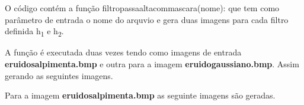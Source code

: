 \documentclass[10pt,a4paper]{article}
\begin{document}
\begin{flushleft}
O código contém a função {\ttfamily filtro\textunderscore passa\textunderscore alta\textunderscore com\textunderscore mascara(nome):} que tem como parâmetro de entrada o nome do arquvio e gera duas imagens para cada filtro definida h\textsubscript{1} e h\textsubscript{2}.
\end{flushleft}

\begin{flushleft}
A função é executada duas vezes tendo como imagens de entrada  \textbf{e\textunderscore ruido\textunderscore salpimenta.bmp} e outra para a imagem \textbf{e\textunderscore ruido\textunderscore gaussiano.bmp}. Assim gerando as seguintes imagens.
\end{flushleft}

\begin{flushleft}
Para a imagem \textbf{e\textunderscore ruido\textunderscore salpimenta.bmp} as seguinte imagens são geradas.
\end{flushleft}

\begin{figure}[H]
    \centering
    \qquad
\end{figure}
\end{document}

